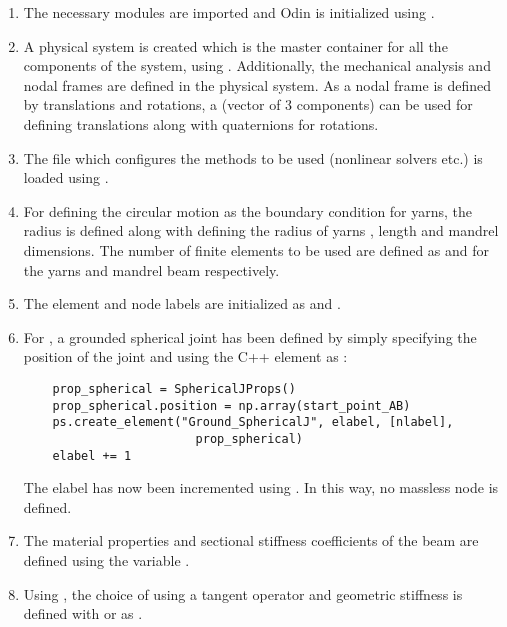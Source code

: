 \begin{enumerate}
    \item The necessary modules are imported and Odin is initialized using .
    \item A physical system is created which is the master container for all the components of the system, using . Additionally, the mechanical analysis and nodal frames are defined in the physical system. As a nodal frame is defined by translations and rotations, a  (vector of 3 components) can be used for defining translations along with quaternions for rotations.
    \item The  file which configures the methods to be used (nonlinear solvers etc.) is loaded using .
    \item For defining the circular motion as the boundary condition for yarns, the radius  is defined along with defining the radius of yarns , length  and mandrel dimensions. The number of finite elements to be used are defined as  and  for the yarns and mandrel beam respectively.
    \item The element and node labels are initialized as  and .
    \item For , a grounded spherical joint has been defined by simply specifying the position of the joint and using the C++ element  as :
    \pythonstyle
    \begin{tcolorbox}\begin{lstlisting}
    prop_spherical = SphericalJProps()
    prop_spherical.position = np.array(start_point_AB)
    ps.create_element("Ground_SphericalJ", elabel, [nlabel],
                        prop_spherical)
    elabel += 1 
    \end{lstlisting}\end{tcolorbox}
        The elabel has now been incremented using . In this way, no massless node is defined.
    \item The material properties and sectional stiffness coefficients of the beam are defined using the variable . 
    \item Using , the choice of using a tangent operator and geometric stiffness is defined with  or  as .

\end{enumerate}
